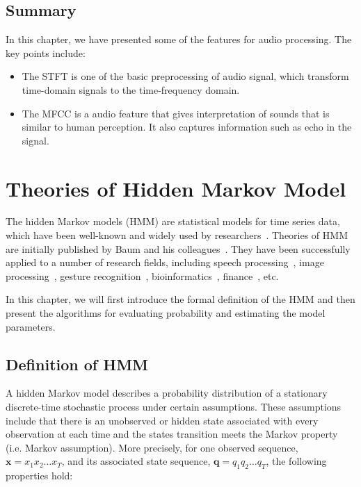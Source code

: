\documentclass[12pt,final,twoside]{report}
\begin{document}
\section{Summary}
In this chapter, we have presented some of the features for audio processing. The key points include:
\begin{itemize}
  \item The STFT is one of the basic preprocessing of audio signal, which transform time-domain signals to the time-frequency domain.
  \item The MFCC is a audio feature that gives interpretation of sounds that is similar to human perception. It also captures information such as echo in the signal.
\end{itemize}

\cleardoublepage
\chapter{Theories of Hidden Markov Model}
\label{ch:hmm}
The hidden Markov models (HMM) are statistical models for time series data, which have been well-known and widely used by researchers~\cite{rabiner_tutorial_1989, rabiner_fundamentals_1993}. Theories of HMM are initially published by Baum and his colleagues~\cite{baum_statistical_1966, baum_maximization_1970}. They have been successfully applied to a number of research fields, including speech processing~\cite{baker_dragon_1975, rabiner_fundamentals_1993}, image processing~\cite{chen_off-line_1994}, gesture recognition~\cite{mitra_gesture_2007}, bioinformatics~\cite{koski_hidden_2001}, finance~\cite{bhar_hidden_2004}, etc.

In this chapter, we will first introduce the formal definition of the HMM and then present the algorithms for evaluating probability and estimating the model parameters.

\section{Definition of HMM} \label{sec:hmm}
A hidden Markov model describes a probability distribution of a stationary discrete-time stochastic process under certain assumptions. These assumptions include that there is an unobserved or hidden state associated with every observation at each time and the states transition meets the Markov property (i.e. Markov assumption). More precisely, for one observed sequence, $\mathbf{x} = x_1 x_2 \dots x_T$, and its associated state sequence, $\mathbf{q} = q_1 q_2 \dots q_T$, the following properties hold:
\end{document}
